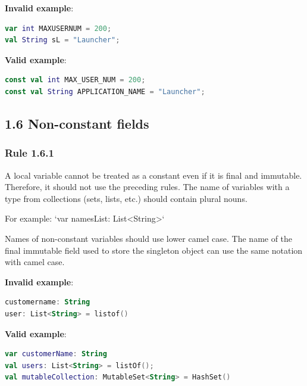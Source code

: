 \textbf{Invalid example}: 



\begin{lstlisting}[language=Kotlin]
var int MAXUSERNUM = 200;
val String sL = "Launcher";
\end{lstlisting}


\textbf{Valid example}:



\begin{lstlisting}[language=Kotlin]
const val int MAX_USER_NUM = 200;
const val String APPLICATION_NAME = "Launcher";
\end{lstlisting}


\subsection*{\textbf{1.6 Non-constant fields}}

\subsubsection*{\textbf{Rule 1.6.1}}
\leavevmode\newline



A local variable cannot be treated as a constant even if it is final and immutable. Therefore, it should not use the preceding rules. The name of variables with a type from collections (sets, lists, etc.) should contain plural nouns.

For example: `var namesList: List<String>`



Names of non-constant variables should use lower camel case. The name of the final immutable field used to store the singleton object can use the same notation with camel case.



\textbf{Invalid example}: 

\begin{lstlisting}[language=Kotlin]
customername: String
user: List<String> = listof()
\end{lstlisting}


\textbf{Valid example}: 

\begin{lstlisting}[language=Kotlin]
var customerName: String
val users: List<String> = listOf();
val mutableCollection: MutableSet<String> = HashSet()
\end{lstlisting}


